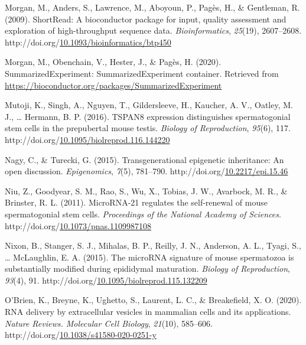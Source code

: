 \documentclass[12pt,twoside]{reedthesis}
\newlength{\cslhangindent}
\newenvironment{CSLReferences}[2] %
 {%
  \setlength{\parindent}{0pt}
  \ifodd #1 \everypar{\setlength{\hangindent}{\cslhangindent}}\ignorespaces\fi
  \ifnum #2 > 0
  \setlength{\parskip}{#2\baselineskip}
  \fi
 }%
 {}
\begin{document}
\begin{CSLReferences}{1}{0}
\leavevmode{}%
Morgan, M., Anders, S., Lawrence, M., Aboyoun, P., Pagès, H., \& Gentleman, R. (2009). ShortRead: A bioconductor package for input, quality assessment and exploration of high-throughput sequence data. \emph{Bioinformatics}, \emph{25}(19), 2607--2608. http://doi.org/\href{https://doi.org/10.1093/bioinformatics/btp450}{10.1093/bioinformatics/btp450}

\leavevmode{}%
Morgan, M., Obenchain, V., Hester, J., \& Pagès, H. (2020). SummarizedExperiment: SummarizedExperiment container. Retrieved from \url{https://bioconductor.org/packages/SummarizedExperiment}

\leavevmode{}%
Mutoji, K., Singh, A., Nguyen, T., Gildersleeve, H., Kaucher, A. V., Oatley, M. J., \ldots{} Hermann, B. P. (2016). TSPAN8 expression distinguishes spermatogonial stem cells in the prepubertal mouse testis. \emph{Biology of Reproduction}, \emph{95}(6), 117. http://doi.org/\href{https://doi.org/10.1095/biolreprod.116.144220}{10.1095/biolreprod.116.144220}

\leavevmode{}%
Nagy, C., \& Turecki, G. (2015). Transgenerational epigenetic inheritance: An open discussion. \emph{Epigenomics}, \emph{7}(5), 781--790. http://doi.org/\href{https://doi.org/10.2217/epi.15.46}{10.2217/epi.15.46}

\leavevmode{}%
Niu, Z., Goodyear, S. M., Rao, S., Wu, X., Tobias, J. W., Avarbock, M. R., \& Brinster, R. L. (2011). MicroRNA-21 regulates the self-renewal of mouse spermatogonial stem cells. \emph{Proceedings of the National Academy of Sciences}. http://doi.org/\href{https://doi.org/10.1073/pnas.1109987108}{10.1073/pnas.1109987108}

\leavevmode{}%
Nixon, B., Stanger, S. J., Mihalas, B. P., Reilly, J. N., Anderson, A. L., Tyagi, S., \ldots{} McLaughlin, E. A. (2015). The {microRNA} signature of mouse spermatozoa is substantially modified during epididymal maturation. \emph{Biology of Reproduction}, \emph{93}(4), 91. http://doi.org/\href{https://doi.org/10.1095/biolreprod.115.132209}{10.1095/biolreprod.115.132209}

\leavevmode{}%
O'Brien, K., Breyne, K., Ughetto, S., Laurent, L. C., \& Breakefield, X. O. (2020). RNA delivery by extracellular vesicles in mammalian cells and its applications. \emph{Nature Reviews. Molecular Cell Biology}, \emph{21}(10), 585--606. http://doi.org/\href{https://doi.org/10.1038/s41580-020-0251-y}{10.1038/s41580-020-0251-y}


\end{CSLReferences}
\end{document}
